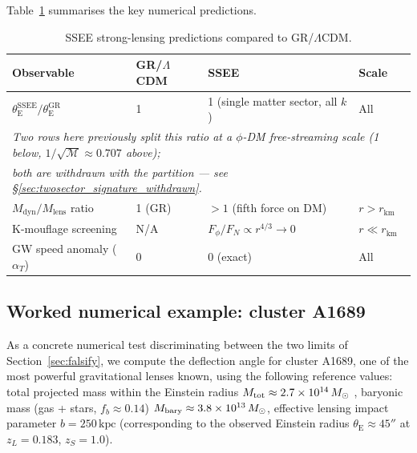 \documentclass[12pt,a4paper]{article}
\newcommand{\MIRA}{\mathcal{M}}
\newcommand{\rV}{r_{\mathrm{km}}}
\newcommand{\thetaE}{\theta_{\mathrm{E}}}
\begin{document}
Table~\ref{tab:lensing_numbers} summarises the key numerical predictions.

\begin{table}[h]
\centering
\caption{SSEE strong-lensing predictions compared to GR/$\Lambda$CDM.}
\label{tab:lensing_numbers}
\begin{tabular}{llll}
\toprule
\textbf{Observable} & \textbf{GR/$\Lambda$CDM} & \textbf{SSEE} & \textbf{Scale} \\
\midrule
$\thetaE^{\mathrm{SSEE}}/\thetaE^{\mathrm{GR}}$
  & 1
  & 1 (single matter sector, all $k$)
  & All \\
\multicolumn{4}{l}{\footnotesize\emph{Two rows here previously split this ratio at a
$\phi$-DM free-streaming scale (1 below, $1/\sqrt{\MIRA}\approx0.707$ above);}} \\
\multicolumn{4}{l}{\footnotesize\emph{both are withdrawn with the partition ---
see \S\ref{sec:twosector_signature_withdrawn}.}} \\
$M_{\mathrm{dyn}}/M_{\mathrm{lens}}$ ratio
  & 1 (GR)
  & $> 1$ (fifth force on DM)
  & $r > \rV$ \\
K-mouflage screening
  & N/A
  & $F_\phi/F_N \propto r^{4/3} \to 0$
  & $r \ll \rV$ \\
GW speed anomaly ($\alpha_T$)
  & 0
  & 0 (exact)
  & All \\
\bottomrule
\end{tabular}
\end{table}

\subsection{Worked numerical example: cluster A1689}
\label{sec:a1689}

As a concrete numerical test discriminating between the two limits of
Section~\ref{sec:falsify}, we compute the deflection angle for cluster
A1689, one of the most powerful gravitational lenses known, using the
following reference values: total projected mass within the Einstein
radius $M_{\rm tot} \approx 2.7\times10^{14}\,M_\odot$
\citep{Limousin2007}, baryonic mass (gas + stars, $f_b\approx 0.14$)
$M_{\rm bary} \approx 3.8\times10^{13}\,M_\odot$, effective lensing
impact parameter $b = 250\,\mathrm{kpc}$ (corresponding to the observed
Einstein radius $\thetaE\approx45''$ at $z_L=0.183$, $z_S=1.0$).
\end{document}
